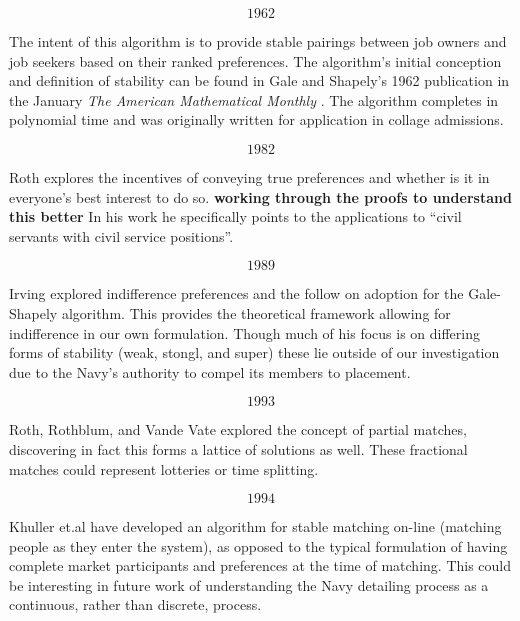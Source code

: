 
\[1962\]

The intent of this algorithm is to provide stable pairings between job owners and job seekers based on their ranked preferences. The algorithm's initial conception and definition of stability can be found in Gale and Shapely's 1962 publication in the January \textit{The American Mathematical Monthly} \cite{gale_shapely}. The algorithm completes in polynomial time and was originally written for application in collage admissions.

\[1982\]

Roth explores the incentives of conveying true preferences and whether is it in everyone's best interest to do so. \cite{incentives} \textbf{working through the proofs to understand this better} In his work he specifically points to the applications to ``civil servants with civil service positions''.

\[1989\]

Irving explored indifference preferences and the follow on adoption for the Gale-Shapely algorithm. \cite{indifference} This provides the theoretical framework allowing for indifference in our own formulation. Though much of his focus is on differing forms of stability (weak, stongl, and super) these lie outside of our investigation due to the Navy's authority to compel its members to placement.

\[1993\]

Roth, Rothblum, and Vande Vate explored the concept of partial matches, discovering in fact this forms a lattice of solutions as well. These fractional matches could represent lotteries or time splitting. \cite{partial}

\[1994\]

Khuller et.al have developed an algorithm for stable matching on-line (matching people as they enter the system), as opposed to the typical formulation of having complete market participants and preferences at the time of matching. \cite{online} This could be interesting in future work of understanding the Navy detailing process as a continuous, rather than discrete, process.